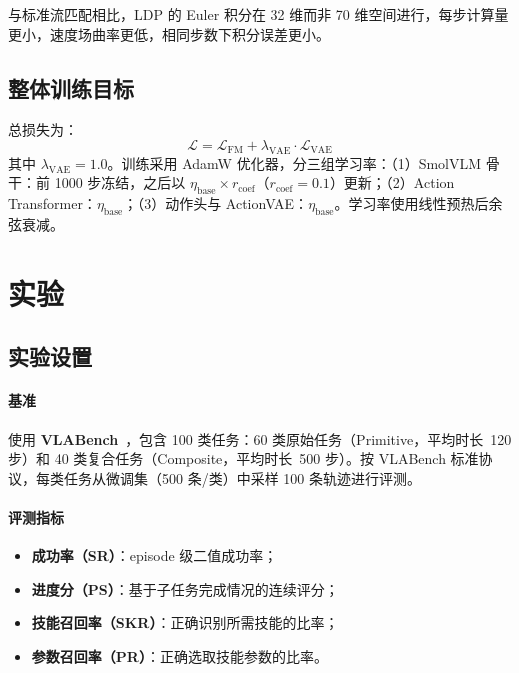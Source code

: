 \documentclass[10pt,twocolumn]{article}
\begin{document}
与标准流匹配相比，LDP 的 Euler 积分在 32 维而非 70 维空间进行，每步计算量更小，速度场曲率更低，相同步数下积分误差更小。

\subsection{整体训练目标}

总损失为：
\begin{equation}
  \mathcal{L} = \mathcal{L}_{\text{FM}} + \lambda_{\text{VAE}} \cdot \mathcal{L}_{\text{VAE}}
  \label{eq:total}
\end{equation}
其中 $\lambda_{\text{VAE}} = 1.0$。训练采用 AdamW 优化器，分三组学习率：（1）SmolVLM 骨干：前 1000 步冻结，之后以 $\eta_{\text{base}} \times r_{\text{coef}}$（$r_{\text{coef}} = 0.1$）更新；（2）Action Transformer：$\eta_{\text{base}}$；（3）动作头与 ActionVAE：$\eta_{\text{base}}$。学习率使用线性预热后余弦衰减。

\section{实验}
\label{sec:exp}

\subsection{实验设置}

\paragraph{基准}
使用 \textbf{VLABench}~\cite{vlabench2025}，包含 100 类任务：60 类原始任务（Primitive，平均时长~120 步）和 40 类复合任务（Composite，平均时长~500 步）。按 VLABench 标准协议，每类任务从微调集（500 条/类）中采样 100 条轨迹进行评测。

\paragraph{评测指标}
\begin{itemize}[leftmargin=*]
  \item \textbf{成功率（SR）}：episode 级二值成功率；
  \item \textbf{进度分（PS）}：基于子任务完成情况的连续评分；
  \item \textbf{技能召回率（SKR）}：正确识别所需技能的比率；
  \item \textbf{参数召回率（PR）}：正确选取技能参数的比率。
\end{itemize}
\end{document}
